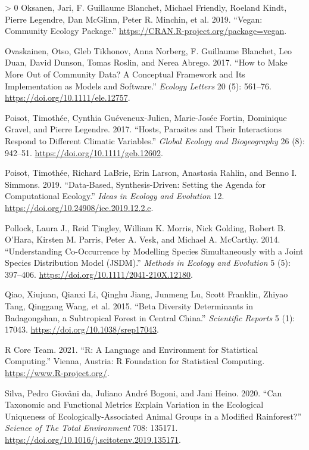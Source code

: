 \documentclass[11pt]{article}
\newlength{\cslhangindent}
\newenvironment{CSLReferences}[3] %
 {%
  \setlength{\parindent}{0pt}
  \ifodd #1 \everypar{\setlength{\hangindent}{\cslhangindent}}\ignorespaces\fi
  \ifnum #2 > 0
  \setlength{\parskip}{#2\baselineskip}
  \fi
 }%
 {}
\begin{document}
\begin{CSLReferences}{1}{0}
\leavevmode\hypertarget{ref-Oksanen2019VegCom}{}%
Oksanen, Jari, F. Guillaume Blanchet, Michael Friendly, Roeland Kindt,
Pierre Legendre, Dan McGlinn, Peter R. Minchin, et al. 2019. {``Vegan:
Community Ecology Package.''}
\url{https://CRAN.R-project.org/package=vegan}.

\leavevmode\hypertarget{ref-Ovaskainen2017HowMak}{}%
Ovaskainen, Otso, Gleb Tikhonov, Anna Norberg, F. Guillaume Blanchet,
Leo Duan, David Dunson, Tomas Roslin, and Nerea Abrego. 2017. {``How to
Make More Out of Community Data? A Conceptual Framework and Its
Implementation as Models and Software.''} \emph{Ecology Letters} 20 (5):
561--76. \url{https://doi.org/10.1111/ele.12757}.

\leavevmode\hypertarget{ref-Poisot2017HosPar}{}%
Poisot, Timothée, Cynthia Guéveneux-Julien, Marie-Josée Fortin,
Dominique Gravel, and Pierre Legendre. 2017. {``Hosts, Parasites and
Their Interactions Respond to Different Climatic Variables.''}
\emph{Global Ecology and Biogeography} 26 (8): 942--51.
\url{https://doi.org/10.1111/geb.12602}.

\leavevmode\hypertarget{ref-Poisot2019DatSyn}{}%
Poisot, Timothée, Richard LaBrie, Erin Larson, Anastasia Rahlin, and
Benno I. Simmons. 2019. {``Data-Based, Synthesis-Driven: Setting the
Agenda for Computational Ecology.''} \emph{Ideas in Ecology and
Evolution} 12. \url{https://doi.org/10.24908/iee.2019.12.2.e}.

\leavevmode\hypertarget{ref-Pollock2014UndCoo}{}%
Pollock, Laura J., Reid Tingley, William K. Morris, Nick Golding, Robert
B. O'Hara, Kirsten M. Parris, Peter A. Vesk, and Michael A. McCarthy.
2014. {``Understanding Co-Occurrence by Modelling Species Simultaneously
with a Joint Species Distribution Model (JSDM).''} \emph{Methods in
Ecology and Evolution} 5 (5): 397--406.
\url{https://doi.org/10.1111/2041-210X.12180}.

\leavevmode\hypertarget{ref-Qiao2015BetDiv}{}%
Qiao, Xiujuan, Qianxi Li, Qinghu Jiang, Junmeng Lu, Scott Franklin,
Zhiyao Tang, Qinggang Wang, et al. 2015. {``Beta Diversity Determinants
in Badagongshan, a Subtropical Forest in Central China.''}
\emph{Scientific Reports} 5 (1): 17043.
\url{https://doi.org/10.1038/srep17043}.

\leavevmode\hypertarget{ref-RCoreTeam2021RLan}{}%
R Core Team. 2021. {``R: A Language and Environment for Statistical
Computing.''} Vienna, Austria: R Foundation for Statistical Computing.
\url{https://www.R-project.org/}.

\leavevmode\hypertarget{ref-daSilva2020CanTax}{}%
Silva, Pedro Giovâni da, Juliano André Bogoni, and Jani Heino. 2020.
{``Can Taxonomic and Functional Metrics Explain Variation in the
Ecological Uniqueness of Ecologically-Associated Animal Groups in a
Modified Rainforest?''} \emph{Science of The Total Environment} 708:
135171. \url{https://doi.org/10.1016/j.scitotenv.2019.135171}.


\end{CSLReferences}
\end{document}
